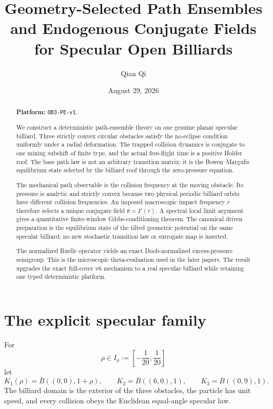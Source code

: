 \documentclass[11pt,reqno]{amsart}
\title[Specular path ensembles and conjugate fields]{Geometry-Selected Path Ensembles and Endogenous Conjugate Fields for Specular Open Billiards}
\author{Qian Qi}
\date{August 29, 2026}
\theoremstyle{definition}
\theoremstyle{remark}
\begin{document}
\raggedbottom
\begin{abstract}
\noindent\textbf{Platform: }\texttt{OB3-PE-v1}.\par
We construct a deterministic path-ensemble theory on one genuine planar
specular billiard.  Three strictly convex circular obstacles satisfy the
no-eclipse condition uniformly under a radial deformation.  The trapped
collision dynamics is conjugate to one mixing subshift of finite type, and the
actual free-flight time is a positive Holder roof.  The base path law is not an
arbitrary transition matrix: it is the Bowen--Margulis equilibrium state
selected by the billiard roof through the zero-pressure equation.

The mechanical path observable is the collision frequency at the moving
obstacle.  Its pressure is analytic and strictly convex because two physical
periodic billiard orbits have different collision frequencies.  An imposed
macroscopic impact frequency $r$ therefore selects a unique conjugate field
$\theta=I'(r)$.  A spectral local limit argument gives a quantitative
finite-window Gibbs-conditioning theorem.  The canonical driven preparation
is the equilibrium state of the tilted geometric potential on the same
specular billiard; no new stochastic transition law or surrogate map is
inserted.

The normalized Ruelle operator yields an exact Doob-normalized excess-pressure
semigroup.  This is the microscopic theta-evaluation used in the later papers.
The result upgrades the exact full-cover v6 mechanism to a real specular
billiard while retaining one typed deterministic platform.
\end{abstract}
\maketitle
\tableofcontents

\section{The explicit specular family}\label{sec:geometry}
For
\[
 \rho\in I_\rho:=\left[-\frac1{20},\frac1{20}\right]
\]
let
\[
 K_1(\rho)=\overline B((0,0),1+\rho),\qquad
 K_2=\overline B((6,0),1),\qquad
 K_3=\overline B((0,9),1).
\]
The billiard domain is the exterior of the three obstacles, the particle has
unit speed, and every collision obeys the Euclidean equal-angle specular law.
\end{document}
